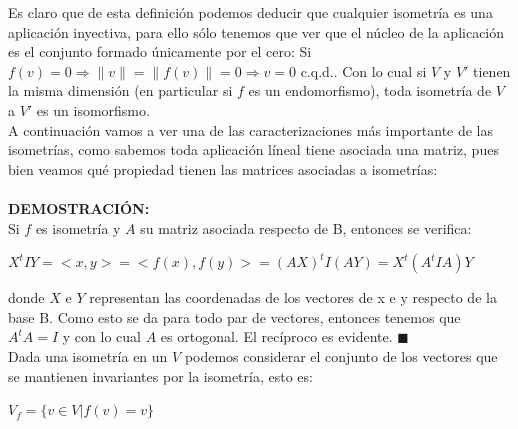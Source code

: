 \documentclass[10pt,a4paper]{article}
\theoremstyle{mystyle}
\newtheorem{teo}{\textcolor{blue}{\textbf{Teorema}}}
\begin{document}
Es claro que de esta definición podemos deducir que cualquier isometría es una aplicación inyectiva, para ello sólo tenemos que ver que el núcleo de la aplicación es el conjunto formado únicamente por el cero: Si $f(v) = 0 \Rightarrow \parallel v \parallel = \parallel f(v) \parallel = 0 \Rightarrow v = 0$ c.q.d.. Con lo cual si $V$ y $V'$ tienen la misma dimensión (en particular si $f$ es un endomorfismo), toda isometría de $V$ a $V'$ es un isomorfismo.\\

A continuación vamos a ver una de las caracterizaciones más importante de las isometrías, como sabemos toda aplicación líneal tiene asociada una matriz, pues bien veamos qué propiedad tienen las matrices asociadas a isometrías:\\

\hfill \\

\textbf{DEMOSTRACIÓN:}\\

Si $f$ es isometría y $A$ su matriz asociada respecto de B, entonces se verifica:\\

\begin{center}
$X^tIY = <x,y> = <f(x),f(y)> = (AX)^tI(AY) = X^t(A^tIA)Y$
\end{center}

donde $X$ e $Y$ representan las coordenadas de los vectores de x e y respecto de la base B. Como esto se da para todo par de vectores, entonces tenemos que $A^tA = I$ y con lo cual $A$ es ortogonal. El recíproco es evidente. $\blacksquare$\\

Dada una isometría en un $V$ podemos considerar el conjunto de los vectores que se mantienen invariantes por la isometría, esto es:\\

\begin{center}
$V_f = \lbrace v \in V \vert f(v) = v \rbrace$
\end{center}
\end{document}
